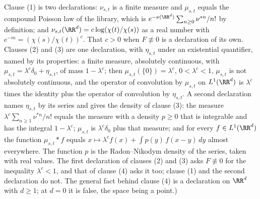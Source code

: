 \begin{proposition}
{Clause (1) is two declarations: $\nu_{s,t}$ is a finite measure and $\mu_{s,t}$ equals the
compound Poisson law of the library, which is $e^{-\nu(\RR^d)}\sum_{n \ge 0}\nu^{*n}/n!$ by
definition; and $\nu_{s,t}(\RR^d) = c\log(\chi(t)/\chi(s))$ as a real number with
$e^{-m} = (\chi(s)/\chi(t))^c$. That $c > 0$ when $F \not\equiv 0$ is a declaration of its own.
Clauses (2) and (3) are one
declaration, with $\eta_{s,t}$ under an existential quantifier, named by its properties: a
finite measure, absolutely continuous, with $\mu_{s,t} = \lambda^c\delta_0 + \eta_{s,t}$, of mass
$1 - \lambda^c$; then $\mu_{s,t}(\{0\}) = \lambda^c$, $0 < \lambda^c < 1$, $\mu_{s,t}$ is not
absolutely continuous, and the operator of convolution by $\mu_{s,t}$ on $L^1(\RR^d)$ is
$\lambda^c$ times the identity plus the operator of convolution by $\eta_{s,t}$. A second
declaration names $\eta_{s,t}$ by its series and gives the density of clause (3): the measure
$\lambda^c\sum_{n \ge 1}\nu^{*n}/n!$ equals the measure with a density $p \ge 0$ that is
integrable and has the integral $1 - \lambda^c$; $\mu_{s,t}$ is $\lambda^c\delta_0$ plus that
measure; and for every $f \in L^1(\RR^d)$ the function $\mu_{s,t} * f$ equals
$x \mapsto \lambda^c f(x) + \int p(y)\,f(x - y)\,dy$ almost everywhere. The function $p$ is the
Radon--Nikodym density of the series, taken with real values.
The first declaration of clauses (2) and (3) asks $F \not\equiv 0$ for the inequality
$\lambda^c < 1$, and that of clause (4) asks it too; clause (1) and the second declaration do
not. The general fact behind clause (4) is a
declaration on $\RR^d$ with $d \ge 1$; at $d = 0$ it is false, the space being a point.)}
\end{proposition}

